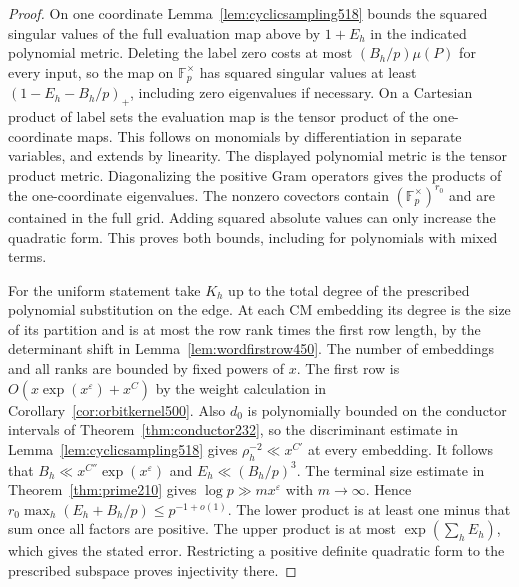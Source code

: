 \documentclass[a4paper,11pt]{article}
\theoremstyle{definition}
\theoremstyle{remark}
\numberwithin{equation}{section}
\begin{document}
\begin{proof}
On one coordinate Lemma~\ref{lem:cyclicsampling518} bounds the
squared singular values of the full evaluation map above by
\(1+E_h\) in the indicated polynomial metric. Deleting the label
zero costs at most \((B_h/p)\mu(P)\) for every input, so the map
on \(\mathbb F_p^\times\) has squared singular values at least
\((1-E_h-B_h/p)_+\), including zero eigenvalues if necessary.
On a Cartesian product of label sets the evaluation map is the
tensor product of the one-coordinate maps. This follows on monomials
by differentiation in separate variables, and extends by linearity.
The displayed polynomial metric is the tensor product metric.
Diagonalizing the positive Gram operators gives the products of
the one-coordinate eigenvalues. The nonzero covectors contain
\((\mathbb F_p^\times)^{r_0}\) and are contained in the full grid.
Adding squared absolute values can only increase the quadratic form.
This proves both bounds, including for polynomials with mixed terms.

For the uniform statement take \(K_h\) up to the total degree of
the prescribed polynomial substitution on the edge. At each CM
embedding its degree is the size of its partition and is at most
the row rank times the first row length, by the determinant shift
in Lemma~\ref{lem:wordfirstrow450}. The number of embeddings and
all ranks are bounded by fixed powers of \(x\). The first row
is \(O(x\exp(x^\varepsilon)+x^C)\) by the weight calculation in
Corollary~\ref{cor:orbitkernel500}. Also \(d_0\) is polynomially
bounded on the conductor intervals of Theorem~\ref{thm:conductor232},
so the discriminant estimate in Lemma~\ref{lem:cyclicsampling518}
gives \(\rho_h^{-2}\ll x^{C'}\) at every embedding. It follows
that \(B_h\ll x^{C''}\exp(x^\varepsilon)\) and
\(E_h\ll (B_h/p)^3\). The terminal size estimate in
Theorem~\ref{thm:prime210} gives \(\log p\gg m x^\varepsilon\)
with \(m\to\infty\). Hence \(r_0\max_h(E_h+B_h/p)\le p^{-1+o(1)}\).
The lower product is at least one minus that sum once all factors
are positive. The upper product is at most \(\exp(\sum_h E_h)\),
which gives the stated error. Restricting a positive definite
quadratic form to the prescribed subspace proves injectivity there.
\end{proof}
\end{document}
